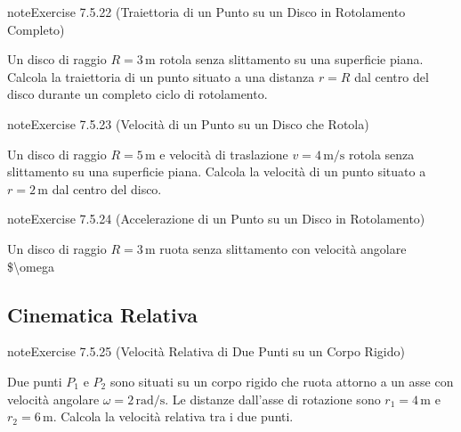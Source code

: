 \documentclass[letterpaper,10pt,italian]{jupyterBook}
\begin{document}
\begin{sphinxadmonition}{note}{Exercise 7.5.22 (Traiettoria di un Punto su un Disco in Rotolamento Completo)}



\sphinxAtStartPar
Un disco di raggio \(R = 3 \, \text{m}\) rotola senza slittamento su una superficie piana. Calcola la traiettoria di un punto situato a una distanza \(r = R\) dal centro del disco durante un completo ciclo di rotolamento.
\end{sphinxadmonition}
 \label{exercise:ch/mechanics/kinematics-problems-exercise-22}

\begin{sphinxadmonition}{note}{Exercise 7.5.23 (Velocità di un Punto su un Disco che Rotola)}



\sphinxAtStartPar
Un disco di raggio \(R = 5 \, \text{m}\) e velocità di traslazione \(v = 4 \, \text{m/s}\) rotola senza slittamento su una superficie piana. Calcola la velocità di un punto situato a \(r = 2 \, \text{m}\) dal centro del disco.
\end{sphinxadmonition}
 \label{exercise:ch/mechanics/kinematics-problems-exercise-23}

\begin{sphinxadmonition}{note}{Exercise 7.5.24 (Accelerazione di un Punto su un Disco in Rotolamento)}



\sphinxAtStartPar
Un disco di raggio \(R = 3 \, \text{m}\) ruota senza slittamento con velocità angolare \$\textbackslash{}omega
\end{sphinxadmonition}


\subsection{Cinematica Relativa}
\label{\detokenize{ch/mechanics/kinematics-problems:cinematica-relativa}} \label{exercise:ch/mechanics/kinematics-problems-exercise-24}

\begin{sphinxadmonition}{note}{Exercise 7.5.25 (Velocità Relativa di Due Punti su un Corpo Rigido)}



\sphinxAtStartPar
Due punti \(P_1\) e \(P_2\) sono situati su un corpo rigido che ruota attorno a un asse con velocità angolare \(\omega = 2 \, \text{rad/s}\). Le distanze dall’asse di rotazione sono \(r_1 = 4 \, \text{m}\) e \(r_2 = 6 \, \text{m}\). Calcola la velocità relativa tra i due punti.
\end{sphinxadmonition}
 \label{exercise:ch/mechanics/kinematics-problems-exercise-25}
\end{document}
